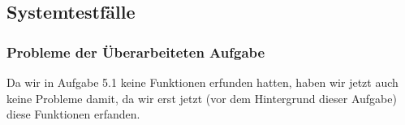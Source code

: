 \documentclass[ngerman]{scrartcl}
\title{\mytitle}
\author{\myauthor}
\newcommand{\blattnummer}{6}												%
\begin{document}
	\setcounter{section}{\blattnummer}
	\subsection{Systemtestfälle}
	\setcounter{subsubsection}{2}
	\subsubsection{Probleme der Überarbeiteten Aufgabe}
	Da wir in Aufgabe 5.1 keine Funktionen erfunden hatten, haben wir jetzt auch keine Probleme damit, da wir erst jetzt (vor dem Hintergrund dieser Aufgabe) diese Funktionen erfanden.
\end{document}

